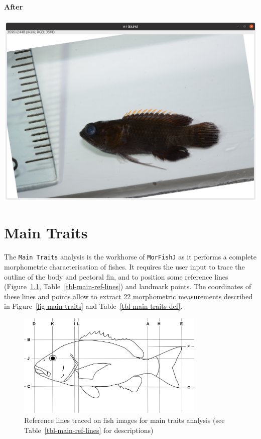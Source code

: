 \documentclass[
  letterpaper,
]{scrbook}
\begin{document}
\hypertarget{after-1}{%
\subsubsection{\texorpdfstring{\textbf{After}}{After}}\label{after-1}}

\includegraphics{./images/screenshots/rotated_example.png}

\hypertarget{sec-main_traits}{%
\chapter{Main Traits}\label{sec-main_traits}}

The \texttt{Main\ Traits} analysis is the workhorse of \texttt{MorFishJ}
as it performs a complete morphometric characterisation of fishes. It
requires the user input to trace the outline of the body and pectoral
fin, and to position some reference lines
(Figure~\ref{fig-main-ref-lines}, Table~\ref{tbl-main-ref-lines}) and
landmark points. The coordinates of these lines and points allow to
extract 22 morphometric measurements described in
Figure~\ref{fig-main-traits} and Table~\ref{tbl-main-traits-def}.

\begin{figure}

{\centering \includegraphics[width=0.8\textwidth,height=\textheight]{./images/drawings/main_ref_lines_sketch.png}

}

\caption{\label{fig-main-ref-lines}Reference lines traced on fish images
for main traits analysis (see Table~\ref{tbl-main-ref-lines} for
descriptions)}

\end{figure}
\end{document}
